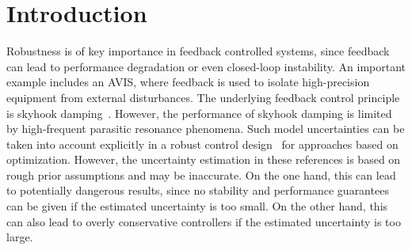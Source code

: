 

\newcommand{\wnValue}{\ensuremath{0.95 \unit{rad/s}}}
\newcommand{\dampingValue}{\ensuremath{0.025}}
\newcommand{\TsValue}{\ensuremath{1 \unit{s}}}

\section{Introduction}
\label{sec:Intro}

Robustness is of key importance in feedback controlled systems, since feedback can lead to performance degradation or even closed-loop instability. 
An important example includes an \gls{AVIS}, where feedback is used to isolate high-precision equipment from external disturbances. 
The underlying feedback control principle is skyhook damping~\citep{Karnopp1995}. 
However, the performance of skyhook damping is limited by high-frequent parasitic resonance phenomena. 
Such model uncertainties can be taken into account explicitly in a robust control design~\citep{Zhang2005HybridAvis} for approaches based on \Hinf{} optimization.
However, the uncertainty estimation in these references is based on rough prior assumptions and may be inaccurate. 
On the one hand, this can lead to potentially dangerous results, since no stability and performance guarantees can be given if the estimated uncertainty is too small. 
On the other hand, this can also lead to overly conservative controllers if the estimated uncertainty is too large.

